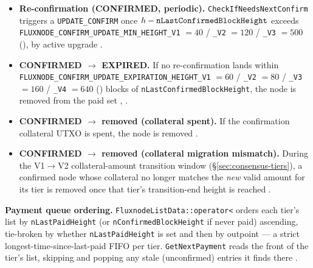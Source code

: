 \begin{itemize}
\item \textbf{Re-confirmation (CONFIRMED, periodic).} \texttt{Check\allowbreak{}If\allowbreak{}Needs\allowbreak{}Next\allowbreak{}Confirm} triggers a
\texttt{UPDATE\_CONFIRM} once $h - \texttt{n\allowbreak{}Last\allowbreak{}Confirmed\allowbreak{}Block\allowbreak{}Height}$ exceeds
\texttt{FLUXNODE\_CONFIRM\_UPDATE\_MIN\_HEIGHT\_V1} $= 40$ / \texttt{\_V2} $= 120$ /
\texttt{\_V3} $= 500$ (\PoN), by active upgrade
\shipped {}.

\item \textbf{CONFIRMED $\to$ EXPIRED.} If no re-confirmation lands within
\texttt{FLUXNODE\_CONFIRM\_UPDATE\_EXPIRATION\_HEIGHT\_V1} $= 60$ / \texttt{\_V2} $= 80$ /
\texttt{\_V3} $= 160$ / \texttt{\_V4} $= 640$ (\PoN) blocks of \texttt{n\allowbreak{}Last\allowbreak{}Confirmed\allowbreak{}Block\allowbreak{}Height}, the
node is removed from the paid set \shipped {},
.

\item \textbf{CONFIRMED $\to$ removed (collateral spent).} If the confirmation collateral UTXO is
spent, the node is removed \shipped {}.

\item \textbf{CONFIRMED $\to$ removed (collateral migration mismatch).} During the V1$\to$V2
collateral-amount transition window (\S\ref{sec:consensus-tiers}), a confirmed node whose collateral no
longer matches the \emph{new} valid amount for its tier is removed once that tier's transition-end
height is reached \shipped {}.
\end{itemize}

\textbf{Payment queue ordering.} \texttt{Fluxnode\allowbreak{}List\allowbreak{}Data::\allowbreak{}operator<} orders each tier's list by
\texttt{n\allowbreak{}Last\allowbreak{}Paid\allowbreak{}Height} (or \texttt{n\allowbreak{}Confirmed\allowbreak{}Block\allowbreak{}Height} if never paid) ascending, tie-broken by
whether \texttt{n\allowbreak{}Last\allowbreak{}Paid\allowbreak{}Height} is set and then by outpoint
\shipped {} — a strict longest-time-since-last-paid
FIFO per tier. \texttt{GetNextPayment} reads the front of the tier's list, skipping and popping any
stale (unconfirmed) entries it finds there
\shipped {}.

